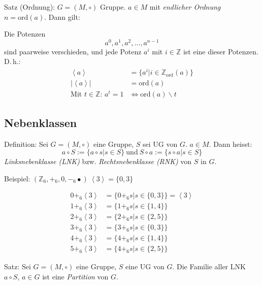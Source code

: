 \documentclass[a4paper, ngerman, landscape, fleqn]{article}
\begin{document}
\begin{multicols*}{3}
\vspace{1.5ex}

Satz (Ordnung): $G=(M, \circ)$ Gruppe. $a \in M$ mit \emph{endlicher Ordnung} $n=\mathrm{ord}(a)$. Dann gilt:
\vspace{1.5ex}

Die Potenzen
\begin{equation*}
    a^0, a^1, a^2, \dotsc, a^{n-1}
\end{equation*}
sind paarweise verschieden, und jede Potenz $a^i$ mit $i \in \mathbb{Z}$ ist eine dieser Potenzen. D.\,h.:
\begin{align*}
    \left<a\right> &= \{a^i | i \in \mathbb{Z}_\mathrm{ord}(a) \} \\
    | \left< a \right> | &= \mathrm{ord}(a) \\
    \text{Mit $t \in \mathbb{Z}$:\ }  
    a^t = 1 &\iff \mathrm{ord}(a) \backslash t
\end{align*}

\subsection*{Nebenklassen}
Definition: Sei $G = (M, \circ)$ eine Gruppe, $S$ sei UG von $G$. $a \in M$.
Dann heisst:
\begin{equation*}
    a \circ S := \{ a \circ s | s \in S\} \ \mathrm{und} \ S \circ a := \{s \circ a | s \in S\}
\end{equation*}
\emph{Linksnebenklasse (LNK)} bzw. \emph{Rechtsnebenklasse (RNK)} von $S$ in $G$.

Beispiel: $(\mathbb{Z}_6, +_6, 0, -_6\bullet)\ \left<3\right> = \{ 0, 3\}$

\begin{align*}
    0 +_6 \left<3\right> &= \{ 0 +_6 s | s \in \{0,3\}\} = \left<3\right> \\
    1 +_6 \left<3\right> &= \{ 1 +_6 s | s \in \{1,4\}\} \\
    2 +_6 \left<3\right> &= \{ 2 +_6 s | s \in \{2,5\}\} \\
    3 +_6 \left<3\right> &= \{ 3 +_6 s | s \in \{0,3\}\} \\
    4 +_6 \left<3\right> &= \{ 4 +_6 s | s \in \{1,4\}\} \\
    5 +_6 \left<3\right> &= \{ 4 +_6 s | s \in \{2,5\}\} 
\end{align*}

Satz: Sei $G = (M, \circ)$ eine Gruppe, $S$ eine UG von $G$. Die Familie aller LNK $a\circ S$, $a \in G$ ist eine \emph{Partition} von $G$.


\end{multicols*}
\end{document}

